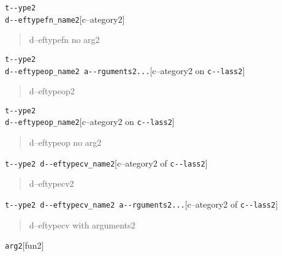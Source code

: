 \documentclass{book}
\begin{document}
\noindent\texttt{t{-}{-}ype2\leavevmode{}\\d{-}{-}eftypefn\_name2}\hfill[c--ategory2]



%
\begin{quote}
\unskip{\parskip=0pt\noindent}%
d--eftypefn no arg2
\end{quote}

\noindent\texttt{t{-}{-}ype2\leavevmode{}\\d{-}{-}eftypeop\_name2 a{-}{-}rguments2...}\hfill[c--ategory2 on \texttt{c{-}{-}lass2}]



%
\begin{quote}
\unskip{\parskip=0pt\noindent}%
d--eftypeop2
\end{quote}

\noindent\texttt{t{-}{-}ype2\leavevmode{}\\d{-}{-}eftypeop\_name2}\hfill[c--ategory2 on \texttt{c{-}{-}lass2}]



%
\begin{quote}
\unskip{\parskip=0pt\noindent}%
d--eftypeop no arg2
\end{quote}

\noindent\texttt{t{-}{-}ype2 d{-}{-}eftypecv\_name2}\hfill[c--ategory2 of \texttt{c{-}{-}lass2}]



%
\begin{quote}
\unskip{\parskip=0pt\noindent}%
d--eftypecv2
\end{quote}

\noindent\texttt{t{-}{-}ype2 d{-}{-}eftypecv\_name2 a{-}{-}rguments2...}\hfill[c--ategory2 of \texttt{c{-}{-}lass2}]



%
\begin{quote}
\unskip{\parskip=0pt\noindent}%
d--eftypecv with arguments2
\end{quote}

\noindent\texttt{arg2}\hfill[fun2]
\end{document}
